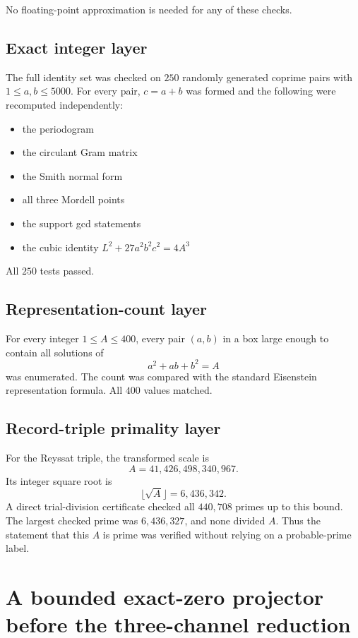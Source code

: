 \documentclass[11pt]{article}
\begin{document}
No floating-point approximation is needed for any of these checks.

\subsection{Exact integer layer}

The full identity set was checked on $250$ randomly generated coprime pairs with $1\leq a,b\leq5000$.  For every pair, $c=a+b$ was formed and the following were recomputed independently:

\begin{itemize}
  \item the periodogram
  \item the circulant Gram matrix
  \item the Smith normal form
  \item all three Mordell points
  \item the support gcd statements
  \item the cubic identity $L^2+27a^2b^2c^2=4A^3$
\end{itemize}

All $250$ tests passed.

\subsection{Representation-count layer}

For every integer $1\leq A\leq400$, every pair $(a,b)$ in a box large enough to contain all solutions of
\[
  a^2+ab+b^2=A
\]
was enumerated.  The count was compared with the standard Eisenstein representation formula.  All $400$ values matched.

\subsection{Record-triple primality layer}

For the Reyssat triple, the transformed scale is
\[
  A=41{,}426{,}498{,}340{,}967.
\]
Its integer square root is
\[
  \lfloor\sqrt A\rfloor=6{,}436{,}342.
\]
A direct trial-division certificate checked all $440{,}708$ primes up to this bound.  The largest checked prime was $6{,}436{,}327$, and none divided $A$.  Thus the statement that this $A$ is prime was verified without relying on a probable-prime label.

\section{A bounded exact-zero projector before the three-channel reduction}
\end{document}
